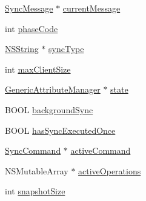 \begin{DoxyCompactItemize}
\item 
\hyperlink{interface_sync_message}{\-Sync\-Message} $\ast$ \hyperlink{interface_session_ae5be82b6c94b660f60d51b63a6f8354c}{current\-Message}
\item 
int \hyperlink{interface_session_abb209f2ab1b3091ca060c6b64b1e4295}{phase\-Code}
\item 
\hyperlink{class_n_s_string}{\-N\-S\-String} $\ast$ \hyperlink{interface_session_a9659360ee94959338599cfbd6047f49b}{sync\-Type}
\item 
int \hyperlink{interface_session_abca6af77c0fea1ffad7112f4864d8421}{max\-Client\-Size}
\item 
\hyperlink{interface_generic_attribute_manager}{\-Generic\-Attribute\-Manager} $\ast$ \hyperlink{interface_session_a13a11a06d1a740d32fdcfb1c40175678}{state}
\item 
\-B\-O\-O\-L \hyperlink{interface_session_a84f69a053d96ee772bc190bc5772ddc7}{background\-Sync}
\item 
\-B\-O\-O\-L \hyperlink{interface_session_a5232b2992884ad0658da406d91b78cc8}{has\-Sync\-Executed\-Once}
\item 
\hyperlink{interface_sync_command}{\-Sync\-Command} $\ast$ \hyperlink{interface_session_acb8b815de9ee21d93f6844ebb4477f64}{active\-Command}
\item 
\-N\-S\-Mutable\-Array $\ast$ \hyperlink{interface_session_a38dc8bbf3fe4bf8496f09986d969f3de}{active\-Operations}
\item 
int \hyperlink{interface_session_a9bf309393d95f16171d611050e5432b5}{snapshot\-Size}
\end{DoxyCompactItemize}


